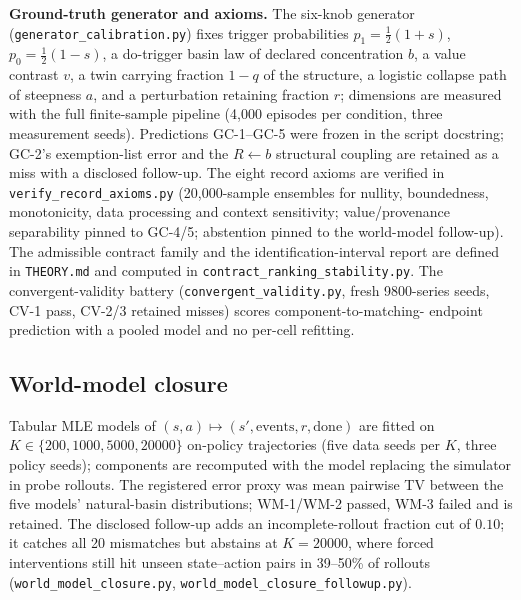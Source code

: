 \documentclass[11pt]{article}
\theoremstyle{definition}
\begin{document}
\textbf{Ground-truth generator and axioms.} The six-knob generator
(\texttt{generator\_calibration.py}) fixes trigger probabilities
$p_1 = \tfrac{1}{2}(1{+}s)$, $p_0 = \tfrac{1}{2}(1{-}s)$, a do-trigger
basin law of declared concentration $b$, a value contrast $v$, a twin
carrying fraction $1{-}q$ of the structure, a logistic collapse path
of steepness $a$, and a perturbation retaining fraction $r$;
dimensions are measured with the full finite-sample pipeline (4{,}000
episodes per condition, three measurement seeds). Predictions
GC-1--GC-5 were frozen in the script docstring; GC-2's exemption-list
error and the $R{\leftarrow}b$ structural coupling are retained as a
miss with a disclosed follow-up. The eight record axioms are verified
in \texttt{verify\_record\_axioms.py} (20{,}000-sample ensembles for
nullity, boundedness, monotonicity, data processing and context
sensitivity; value/provenance separability pinned to GC-4/5;
abstention pinned to the world-model follow-up). The admissible
contract family and the identification-interval report are defined in
\texttt{THEORY.md} and computed in
\texttt{contract\_ranking\_stability.py}. The convergent-validity
battery (\texttt{convergent\_validity.py}, fresh 9800-series seeds,
CV-1 pass, CV-2/3 retained misses) scores component-to-matching-
endpoint prediction with a pooled model and no per-cell refitting.

\subsection*{World-model closure}
Tabular MLE models of $(s,a) \mapsto (s', \text{events}, r,
\text{done})$ are fitted on $K \in \{200, 1000, 5000, 20000\}$
on-policy trajectories (five data seeds per $K$, three policy seeds);
components are recomputed with the model replacing the simulator in
probe rollouts. The registered error proxy was mean pairwise TV
between the five models' natural-basin distributions; WM-1/WM-2
passed, WM-3 failed and is retained. The disclosed follow-up adds an
incomplete-rollout fraction cut of $0.10$; it catches all 20
mismatches but abstains at $K{=}20000$, where forced interventions
still hit unseen state--action pairs in 39--50\% of rollouts
(\texttt{world\_model\_closure.py},
\texttt{world\_model\_closure\_followup.py}).
\end{document}
